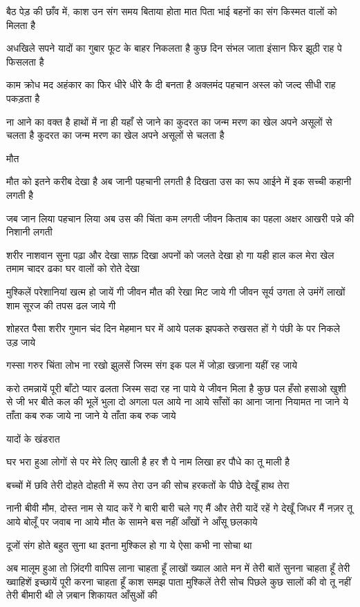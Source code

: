बैठ पेड़ की छाँव में, काश
उन संग समय बिताया होता
मात पिता भाई बहनों का संग
किस्मत वालों को मिलता है

अधखिले सपने यादों का गुबार
फूट के बाहर निकलता है
कुछ दिन संभल जाता इंसान
फिर झूठी राह पे फिसलता है


काम क्रोध मद अहंकार का
फिर धीरे धीरे कै दी बनता है
अक्लमंद पहचान अस्ल को
जल्द सीधी राह पकड़ता है

ना आने का वक्त है हाथों में
ना ही यहाँ से जाने का
कुदरत का जन्म मरण का खेल
अपने असूलों से चलता है
कुदरत का जन्म मरण का खेल
अपने असूलों से चलता है


मौत

मौत को इतने करीब देखा है
अब जानी पहचानी लगती है
दिखता उस का रूप आईने में
इक सच्ची कहानी लगती है

जब जान लिया पहचान लिया
अब उस की चिंता कम लगती
जीवन किताब का पहला अक्षर
आखरी पन्ने की निशानी लगती

शरीर नाशवान सुना पढ़ा और देखा
साफ़ दिखा अपनों को जलते देखा
हो गा यही हाल कल मेरा खेल तमाम
चादर ढका घर वालों को रोते देखा


मुश्किलें परेशानियां खत्म हो जायें गी
जीवन मौत की रेखा मिट जाये गी
जीवन सूर्य उगता ले उमंगें लाखों
शाम सूरज की तपस ढल जाये गी

शोहरत पैसा शरीर गुमान
चंद दिन मेहमान घर में आये
पलक झपकते रुखसत हों गे
पंछी के पर निकले उड़ जाये


गस्सा गरुर चिंता लोभ ना रखो
झुलसें जिस्म संग इक पल में
जोड़ा खज़ाना यहीं रह जाये

करो तमन्नायें पूरी बाँटो प्यार
ढलता जिस्म सदा रह ना पाये
ये जीवन मिला है कुछ पल
हँसो हसाओ खुशी से जी भर
बीते कल की भूलें भुला दो
अगला पल आये ना आये
साँसों का आना जाना नियामत
ना जाने ये ताँता कब रुक जाये
ना जाने ये ताँता कब रुक जाये


यादों के खंडरात

घर भरा हुआ लोगों से पर मेरे लिए खाली है
हर शै पे नाम लिखा हर पौधे का तू माली है

बच्चों में छवि तेरी दोहते दोहती में रूप तेरा
उन की सोच हरकतों के पीछे देखूँ हाथ तेरा

नानी बीवी मौम, दोस्त नाम से याद करें गे
बारी बारी चले गए मैं और तेरी यादें रहें गे
देखूँ जिधर मैं नज़र तू आये
बोलूँ पर जवाब ना आये
मौत के सामने बस नहीं
आँखों ने आँसू छलकाये


दूजों संग होते बहुत सुना था
इतना मुश्किल हो गा ये
ऐसा कभी ना सोचा था

अब मालूम हुआ तो ज़िंदगी
वापिस लाना चाहता हूँ
लाखों ख्याल आते मन में
तेरी बातें सुनना चाहता हूँ
तेरी ख्वाहिशें इच्छायें
पूरी करना चाहता हूँ
काश समझ पाता मुश्किलें तेरी
सोच पिछले कुछ सालों की
वो तू नहीं तेरी बीमारी थी
ले ज़बान शिकायत आँसुओं की

